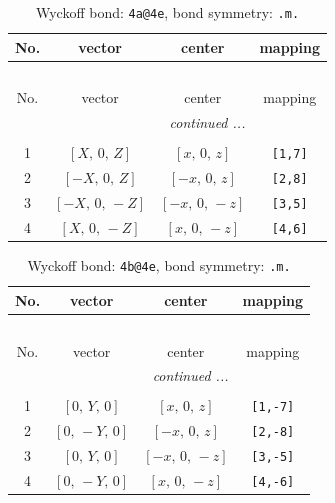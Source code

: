 \documentclass[fleqn,8pt]{jsarticle}
\begin{document}
\begin{longtable}{cccc}
\caption{Wyckoff bond: {\tt 4a@4e}, bond symmetry: {\tt .m.}}
 \\
 \hline \hline
No. & vector & center & mapping \\ \hline \endfirsthead

\multicolumn{3}{l}{\tablename\ \thetable{}} \\
 \hline \hline
No. & vector & center & mapping \\ \hline \endhead

 \hline \hline
\multicolumn{3}{r}{\footnotesize\it continued ...} \\ \endfoot

 \hline \hline
\multicolumn{3}{r}{} \\ \endlastfoot

1 & $\left[ X,\, 0,\, Z \right]$ & $\left[ x,\, 0,\, z \right]$ & {\tt [1,7]} \\ \hline
2 & $\left[ - X,\, 0,\, Z \right]$ & $\left[ - x,\, 0,\, z \right]$ & {\tt [2,8]} \\ \hline
3 & $\left[ - X,\, 0,\, - Z \right]$ & $\left[ - x,\, 0,\, - z \right]$ & {\tt [3,5]} \\ \hline
4 & $\left[ X,\, 0,\, - Z \right]$ & $\left[ x,\, 0,\, - z \right]$ & {\tt [4,6]} \\
\end{longtable}
\renewcommand{\arraystretch}{1.2}
\begin{longtable}{cccc}
\caption{Wyckoff bond: {\tt 4b@4e}, bond symmetry: {\tt .m.}}
 \\
 \hline \hline
No. & vector & center & mapping \\ \hline \endfirsthead

\multicolumn{3}{l}{\tablename\ \thetable{}} \\
 \hline \hline
No. & vector & center & mapping \\ \hline \endhead

 \hline \hline
\multicolumn{3}{r}{\footnotesize\it continued ...} \\ \endfoot

 \hline \hline
\multicolumn{3}{r}{} \\ \endlastfoot

1 & $\left[ 0,\, Y,\, 0 \right]$ & $\left[ x,\, 0,\, z \right]$ & {\tt [1,-7]} \\ \hline
2 & $\left[ 0,\, - Y,\, 0 \right]$ & $\left[ - x,\, 0,\, z \right]$ & {\tt [2,-8]} \\ \hline
3 & $\left[ 0,\, Y,\, 0 \right]$ & $\left[ - x,\, 0,\, - z \right]$ & {\tt [3,-5]} \\ \hline
4 & $\left[ 0,\, - Y,\, 0 \right]$ & $\left[ x,\, 0,\, - z \right]$ & {\tt [4,-6]} \\
\end{longtable}
\end{document}
